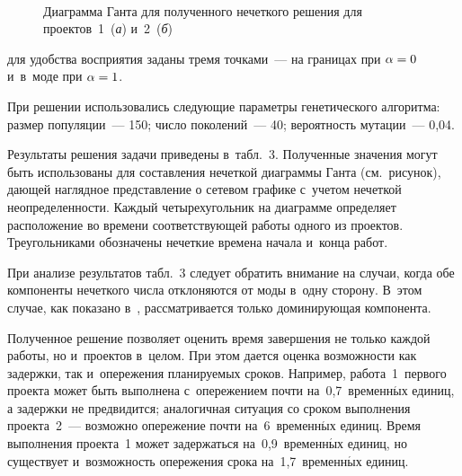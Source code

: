   \begin{multicols}{2}
  
  \begin{figure*}
   \vspace*{1pt}
    \begin{center}  
  \mbox{%
 \epsfxsize=144.026mm 
 }

\vspace*{3pt}

    {\small Диаграмма Ганта для полученного нечеткого решения для
    проектов~1~(\textit{а}) и~2~(\textit{б})}
     \end{center}
          \vspace*{-9pt}
  \end{figure*}
  
  
   \noindent
   для удобства восприятия заданы тремя точками~--- на границах 
при $\alpha\hm=0$ и~в~моде при $\alpha\hm=1$.
  
 
  
  При решении использовались следующие параметры генетического 
алгоритма: размер популяции~--- 150; число поколений~--- 40; вероятность 
мутации~--- 0,04.
  
   Результаты решения задачи приведены в~табл.~3. Полученные значения 
могут быть использованы для составления нечеткой диаграммы Ганта 
(см.\ рисунок), дающей наглядное представление о сетевом графике с~учетом 
нечеткой неопределенности. Каж\-дый четырехугольник на диаграмме 
определяет расположение во времени соответствующей работы
 одного из 
проектов. Треугольниками обозначены нечеткие времена начала и~конца работ.
  
  
  
  
  При анализе результатов табл.~3 следует обратить внимание на случаи, когда 
обе компоненты нечеткого числа отклоняются от моды в~одну сторону. В~этом 
случае, как показано в~\cite{8-zac}, рассматривается только доминирующая 
компонента. 

Полученное решение позволяет оценить время завершения не 
только каждой работы, но и~проектов в~целом. При этом дается оценка 
возможности как задержки, так и~опережения планируемых сроков. Например, 
работа~1~первого проекта может быть выполнена с~опережением почти 
на~0,7~временн$\acute{\mbox{ы}}$х единиц, а задержки не предвидится; аналогичная ситуация 
со сроком выполнения проекта~2~--- возможно опережение почти 
на~6~временн$\acute{\mbox{ы}}$х единиц. Время выполнения проекта~1 может задержаться 
на~0,9~временн$\acute{\mbox{ы}}$х единиц, но существует и~возможность опережения срока 
на~1,7~временн$\acute{\mbox{ы}}$х единиц.
  

\end{multicols}
